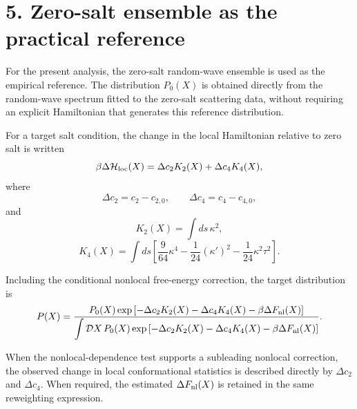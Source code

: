 \documentclass[11pt]{article}
\begin{document}

\section*{5. Zero-salt ensemble as the practical reference}

For the present analysis, the zero-salt random-wave ensemble is used as the empirical reference. The distribution \(P_0(X)\) is obtained directly from the random-wave spectrum fitted to the zero-salt scattering data, without requiring an explicit Hamiltonian that generates this reference distribution.

For a target salt condition, the change in the local Hamiltonian relative to zero salt is written
\begin{equation}
\beta\Delta\mathcal H_{\rm loc}(X)
=
\Delta c_2 K_2(X)
+
\Delta c_4 K_4(X),
\end{equation}
where
\begin{equation}
\Delta c_2=c_2-c_{2,0},
\qquad
\Delta c_4=c_4-c_{4,0},
\end{equation}
and
\begin{equation}
K_2(X)
=
\int ds\,\kappa^2,
\end{equation}
\begin{equation}
K_4(X)
=
\int ds\left[
\frac{9}{64}\kappa^4
-\frac{1}{24}(\kappa')^2
-\frac{1}{24}\kappa^2\tau^2
\right].
\end{equation}

Including the conditional nonlocal free-energy correction, the target distribution is
\begin{equation}
P(X)
=
\frac{
P_0(X)
\exp\left[
-\Delta c_2K_2(X)
-\Delta c_4K_4(X)
-\beta\Delta F_{\rm nl}(X)
\right]
}{
\displaystyle
\int\mathcal D X\,
P_0(X)
\exp\left[
-\Delta c_2K_2(X)
-\Delta c_4K_4(X)
-\beta\Delta F_{\rm nl}(X)
\right]
}.
\end{equation}

When the nonlocal-dependence test supports a subleading nonlocal correction, the observed change in local conformational statistics is described directly by \(\Delta c_2\) and \(\Delta c_4\). When required, the estimated \(\Delta F_{\rm nl}(X)\) is retained in the same reweighting expression.
\end{document}
